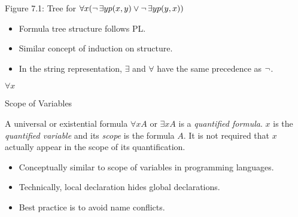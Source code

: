 \documentclass[style=sailor,size=12pt]{powerdot}
\begin{document}
\begin{wideslide}[bm=,toc=]{Figure 7.1: Tree for
$\forall x(\mathop{\neg}\exists yp(x,y)\vee\mathop{\neg}\exists yp(y,x))$}
\begin{multicols}{2}
\begin{itemize}
\item Formula tree structure follows PL.
\item Similar concept of induction on structure.
\item In the string representation, $\exists$ and $\forall$ have the same precedence as $\mathop{\neg}$.
\end{itemize}
\begin{center}
\setlength{\GapWidth}{8mm}
\setlength{\GapDepth}{8mm}
\begin{bundle}{$\forall x$\rule[-1mm]{0mm}{1mm}}
\end{bundle}
\end{center}
\end{multicols}
\end{wideslide}

\begin{wideslide}[bm=,toc=]{Scope of Variables}
\begin{defn}{7.11}
A universal or existential formula $\forall x A$ or $\exists x A$
is a \emph{quantified formula}. $x$ is the \emph{quantified variable}
and its \emph{scope} is the formula $A$. It is not required that $x$
actually appear in the scope of its quantification.
\end{defn}
\begin{itemize}
\item Conceptually similar to scope of variables in programming languages.
\item Technically, local declaration hides global declarations.
\item Best practice is to avoid name conflicts.
\end{itemize}
\end{wideslide}
\end{document}
